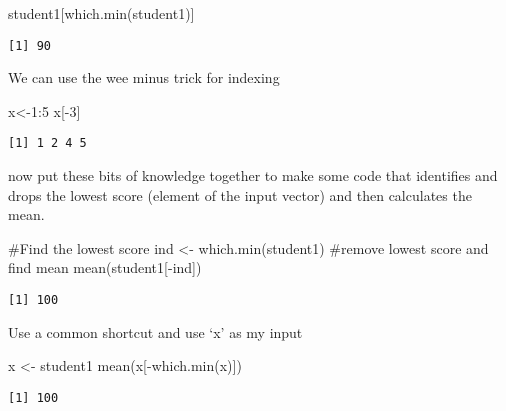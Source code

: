 \documentclass[
  letterpaper,
  DIV=11,
  numbers=noendperiod]{scrartcl}
\newenvironment{Shaded}{\begin{snugshade}}{\end{snugshade}}
\newcommand{\CommentTok}[1]{\textcolor[rgb]{0.37,0.37,0.37}{#1}}
\newcommand{\DecValTok}[1]{\textcolor[rgb]{0.68,0.00,0.00}{#1}}
\newcommand{\FunctionTok}[1]{\textcolor[rgb]{0.28,0.35,0.67}{#1}}
\newcommand{\NormalTok}[1]{\textcolor[rgb]{0.00,0.23,0.31}{#1}}
\newcommand{\OtherTok}[1]{\textcolor[rgb]{0.00,0.23,0.31}{#1}}
\newcommand{\SpecialCharTok}[1]{\textcolor[rgb]{0.37,0.37,0.37}{#1}}
\begin{document}
\begin{Shaded}
\begin{Highlighting}[]
\NormalTok{student1[}\FunctionTok{which.min}\NormalTok{(student1)]}
\end{Highlighting}
\end{Shaded}

\begin{verbatim}
[1] 90
\end{verbatim}

We can use the wee minus trick for indexing

\begin{Shaded}
\begin{Highlighting}[]
\NormalTok{x}\OtherTok{\textless{}{-}}\DecValTok{1}\SpecialCharTok{:}\DecValTok{5}
\NormalTok{x[}\SpecialCharTok{{-}}\DecValTok{3}\NormalTok{]}
\end{Highlighting}
\end{Shaded}

\begin{verbatim}
[1] 1 2 4 5
\end{verbatim}

now put these bits of knowledge together to make some code that
identifies and drops the lowest score (element of the input vector) and
then calculates the mean.

\begin{Shaded}
\begin{Highlighting}[]
\CommentTok{\#Find the lowest score}
\NormalTok{ind }\OtherTok{\textless{}{-}} \FunctionTok{which.min}\NormalTok{(student1)}
\CommentTok{\#remove lowest score and find mean}
\FunctionTok{mean}\NormalTok{(student1[}\SpecialCharTok{{-}}\NormalTok{ind])}
\end{Highlighting}
\end{Shaded}

\begin{verbatim}
[1] 100
\end{verbatim}

Use a common shortcut and use `x' as my input

\begin{Shaded}
\begin{Highlighting}[]
\NormalTok{x }\OtherTok{\textless{}{-}}\NormalTok{ student1}
\FunctionTok{mean}\NormalTok{(x[}\SpecialCharTok{{-}}\FunctionTok{which.min}\NormalTok{(x)])}
\end{Highlighting}
\end{Shaded}

\begin{verbatim}
[1] 100
\end{verbatim}
\end{document}
